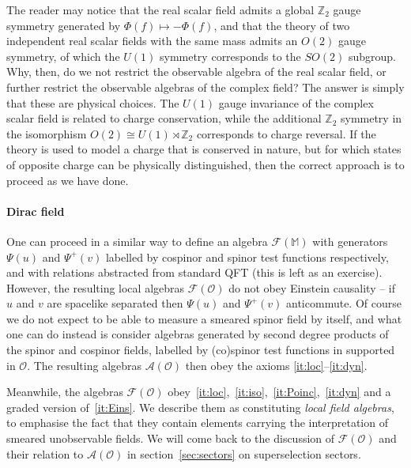\documentclass[12pt,a4paper]{article}
\newcommand{\1}{\mathds{1}}                         %
\newcommand{\ZZ}{\mathbb{Z}} %
\newcommand{\Ocal}{\mathcal{O}}
\newcommand{\MM}{\mathbb{M}}
\newcommand{\Ac}{{\mathcal{A}}}
\newcommand{\Fc}{{\mathcal{F}}}
\begin{document}
	The reader may notice that the real scalar field admits a global $\ZZ_2$ gauge symmetry generated by $\Phi(f)\mapsto -\Phi(f)$, and that the theory of two independent real scalar fields with the same mass admits an $O(2)$ gauge symmetry, of which the $U(1)$ symmetry corresponds to the $SO(2)$ subgroup. Why, then, do we not restrict the observable algebra of the real scalar field, or further restrict the observable algebras of the complex field? The answer is simply that these are physical choices. The $U(1)$ gauge invariance of the complex scalar field is related to charge conservation, while the additional $\ZZ_2$ symmetry
	in the isomorphism $O(2)\cong U(1)\rtimes \ZZ_2$ 
	corresponds to charge reversal. If the theory is used to model a charge that is conserved in nature, but for which states of opposite charge can be physically distinguished, then the correct approach is to proceed as we have done. 
	
	\paragraph{Dirac field} One can proceed in a similar way to define an algebra $\Fc(\MM)$ with generators $\Psi(u)$ and $\Psi^+(v)$ labelled by cospinor and spinor test 
	functions respectively, and with relations abstracted from standard QFT (this is left as an exercise). However, the resulting local algebras $\Fc(\Ocal)$ do not obey Einstein causality -- if $u$ and $v$ are spacelike separated then $\Psi(u)$ and $\Psi^+(v)$ anticommute. Of course we do not expect to be able to measure a smeared spinor field by itself, and what one can do instead is consider algebras generated by second degree products of the spinor and cospinor fields, labelled by (co)spinor test functions in supported in $\Ocal$. The resulting algebras $\Ac(\Ocal)$ then obey the axioms \ref{it:loc}--\ref{it:dyn}. 
	
	Meanwhile, the algebras $\Fc(\Ocal)$ obey~\ref{it:loc},~\ref{it:iso},~\ref{it:Poinc},~\ref{it:dyn} and a graded version of~\ref{it:Eins}. We describe them as constituting \emph{local field algebras}, to emphasise the fact that they contain elements carrying the
	interpretation of smeared unobservable fields. We will come back to the discussion of $\Fc(\Ocal)$ and their relation to $\Ac(\Ocal)$ in section~\ref{sec:sectors} on superselection sectors.  
	
%	
%	
\end{document}
